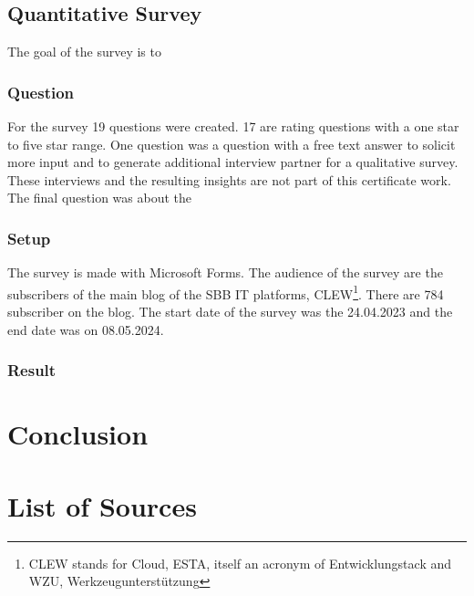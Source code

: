 \documentclass[a4paper,12pt]{article}
\begin{document}
    \subsection{Quantitative Survey}
    The goal of the survey is to

    \subsubsection{Question}
    For the survey 19 questions were created.
    17 are rating questions with a one star to five star range.
    One question was a question with a free text answer to solicit more input and to generate additional interview partner
    for a qualitative survey.
    These interviews and the resulting insights are not part of this certificate work.
    The final question was about the


    \subsubsection{Setup}
    The survey is made with Microsoft Forms.
    The audience of the survey are the subscribers of the main blog of the SBB IT platforms, CLEW\footnote{CLEW stands for Cloud, ESTA, itself an acronym of Entwicklungstack and WZU, Werkzeugunterstützung}.
    There are 784 subscriber on the blog.
    The start date of the survey was the 24.04.2023 and the end date was on 08.05.2024.

    \subsubsection{Result}


    \section{Conclusion}
    \label{sec:conclusion}
    \pagebreak


    \section{List of Sources}
    \label{sec:bibliograhpy}
    \printbibliography[heading=none]
\end{document}
